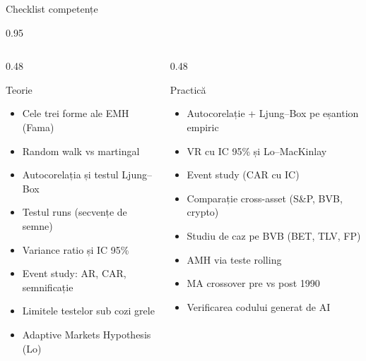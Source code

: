 \documentclass[9pt, aspectratio=169, t]{beamer}
\begin{document}
\begin{frame}[shrink=15]{Checklist competențe}
\begin{cminipage}{0.95\textwidth}
\begin{columns}[T]
\begin{column}{0.48\textwidth}
\begin{block}{Teorie}
\begin{itemize}\setlength{\itemsep}{0pt}
    \item[$\square$] Cele trei forme ale EMH (Fama)
    \item[$\square$] Random walk vs martingal
    \item[$\square$] Autocorelația și testul Ljung--Box
    \item[$\square$] Testul runs (secvențe de semne)
    \item[$\square$] Variance ratio și IC 95\%
    \item[$\square$] Event study: AR, CAR, semnificație
    \item[$\square$] Limitele testelor sub cozi grele
    \item[$\square$] Adaptive Markets Hypothesis (Lo)
\end{itemize}
\end{block}
\end{column}
\begin{column}{0.48\textwidth}
\begin{block}{Practică}
\begin{itemize}\setlength{\itemsep}{0pt}
    \item[$\square$] Autocorelație + Ljung--Box pe eșantion empiric
    \item[$\square$] VR cu IC 95\% și Lo--MacKinlay
    \item[$\square$] Event study (CAR cu IC)
    \item[$\square$] Comparație cross-asset (S\&P, BVB, crypto)
    \item[$\square$] Studiu de caz pe BVB (BET, TLV, FP)
    \item[$\square$] AMH via teste rolling
    \item[$\square$] MA crossover pre vs post 1990
    \item[$\square$] Verificarea codului generat de AI
\end{itemize}
\end{block}
\end{column}
\end{columns}


\end{cminipage}
\end{frame}
\end{document}

